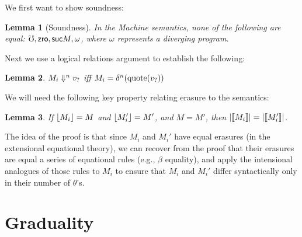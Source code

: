 \documentclass{article}
\newtheorem{lemma}{Lemma}[section]
\begin{document}
We first want to show soundness:

\begin{lemma}[Soundness]
    In the Machine semantics, none of the following are equal: $\mho, \textsf{zro}, \textsf{suc} M, \omega$,
    where $\omega$ represents a diverging program.
\end{lemma}

Next we use a logical relations argument to establish the following:

\begin{lemma}
    $M_i \Downarrow^n v_?$ iff $M_i = \delta^n(\text{quote}({v_?}))$
\end{lemma}

We will need the following key property relating erasure to the semantics:

\begin{lemma}
    If $\lfloor {M_i} \rfloor = M$ and $\lfloor {M_i'} \rfloor = M'$, and $M = M'$, 
    then $| \llbracket {M_i} \rrbracket | = | \llbracket {M_i'} \rrbracket |$.
\end{lemma}

The idea of the proof is that since $M_i$ and $M_i'$ have equal erasures
(in the extensional equational theory), we can recover from the proof that their
erasures are equal a series of equational rules (e.g., $\beta$ equality), and
apply the intensional analogues of those rules to $M_i$ to ensure that $M_i$ and $M_i'$
differ syntactically only in their number of $\theta$'s.

    

\section{Graduality}
\end{document}
